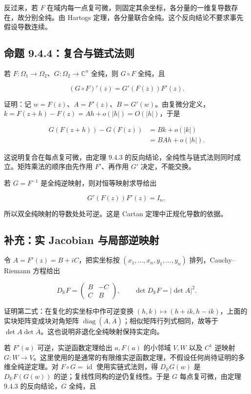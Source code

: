 \documentclass[11pt,a4paper]{article}
\begin{document}
反过来，若 \(F\)
在域内每一点复可微，则固定其余坐标，各分量的一维复导数存在，故分别全纯。由
Hartogs 定理，各分量联合全纯。这个反向结论不要求事先假设导数连续。

\subsection{命题 9.4.4：复合与链式法则}\label{ch09-s4-heading-5}

若 \(F:\Omega_1\to\Omega_2\)、\(G:\Omega_2\to\mathbb C^n\) 全纯，则
\(G\circ F\) 全纯，且

\[
(G\circ F)'(z)=G'(F(z))F'(z).
\]

证明：记
\(w=F(z)\)、\(A=F'(z)\)、\(B=G'(w)\)。由复微分定义，\(k=F(z+h)-F(z)=Ah+o(|h|)=O(|h|)\)，于是

\[
\begin{aligned}
G(F(z+h))-G(F(z))
&=Bk+o(|k|)\\
&=BAh+o(|h|).
\end{aligned}
\]

这说明复合在每点复可微，由定理 9.4.3
的反向结论，全纯性与链式法则同时成立。矩阵乘法的顺序由先作用
\(F'\)、再作用 \(G'\) 决定，不能交换。

若 \(G=F^{-1}\) 是全纯逆映射，则对恒等映射求导给出

\[
G'(F(z))F'(z)=I_n,
\]

所以双全纯映射的导数处处可逆。这是 Cartan 定理中正规化导数的依据。

\subsection*{补充：实 Jacobian 与局部逆映射}\label{ch09-s4-heading-6}

令 \(A=F'(z)=B+iC\)，把实坐标按 \((x_1,\ldots,x_n,y_1,\ldots,y_n)\)
排列，Cauchy--Riemann 方程给出

\[
D_{\mathbb R}F=
\begin{pmatrix}B&-C\\C&B\end{pmatrix},\qquad
\det D_{\mathbb R}F=|\det A|^2.
\]

证明第二式：在复化的实坐标中作可逆变换
\((h,k)\mapsto(h+ik,h-ik)\)，上面的实块矩阵变成块对角矩阵
\(\operatorname{diag}(A,\overline A)\)；相似矩阵行列式相同，故等于
\(\det A\det\overline A\)。这也说明非退化全纯映射保持实定向。

若 \(F'(a)\) 可逆，实逆函数定理给出 \(a,F(a)\) 的小邻域 \(V,W\) 以及
\(C^1\) 逆映射
\(G:W\to V\)。这里使用的是通常的有限维实逆函数定理，不假设任何尚待证明的多维全纯逆定理。对
\(F\circ G=\operatorname{id}\) 使用实链式法则，得 \(D_{\mathbb R}G(w)\)
是 \(D_{\mathbb R}F(G(w))\) 的逆；复线性同构的逆仍复线性。于是 \(G\)
每点复可微，由定理 9.4.3 的反向结论，\(G\) 全纯，且
\end{document}

